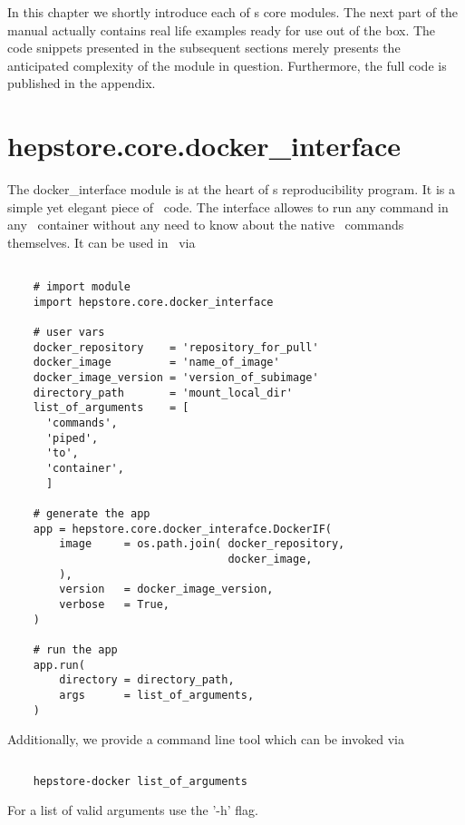 
In this chapter we shortly introduce each of \heptore s core
modules. The next part of the manual actually contains real life
examples ready for use out of the box. The code snippets presented in
the subsequent sections merely presents the anticipated complexity of
the module in question. Furthermore, the full code is published in the
appendix.

\section{hepstore.core.docker\_interface}

The docker\_interface module is at the heart of \hepstore s
reproducibility program. It is a simple yet elegant piece of
\python~code. The interface allowes to run any command in any
\docker~container without any need to know about the native
\docker~commands themselves. It can be used in \python~via
%
\begin{changemargin}{1.5cm}{1.5cm}
  \centering
  \begin{lstlisting}
    
    # import module
    import hepstore.core.docker_interface

    # user vars
    docker_repository    = 'repository_for_pull'
    docker_image         = 'name_of_image'
    docker_image_version = 'version_of_subimage'
    directory_path       = 'mount_local_dir'
    list_of_arguments    = [
      'commands',
      'piped',
      'to',
      'container',
      ]
    
    # generate the app
    app = hepstore.core.docker_interafce.DockerIF(    
        image     = os.path.join( docker_repository,
                                  docker_image,
        ),
        version   = docker_image_version,
        verbose   = True,
    )

    # run the app
    app.run(
        directory = directory_path,
        args      = list_of_arguments,
    )
  \end{lstlisting}
\end{changemargin}
%
Additionally, we provide a command line tool which can be invoked via
%
\begin{changemargin}{1.5cm}{1.5cm}
  \centering
  \begin{lstlisting}[language=Bash]
    
    hepstore-docker list_of_arguments
  \end{lstlisting}
\end{changemargin}
%
For a list of valid arguments use the '-h' flag.

